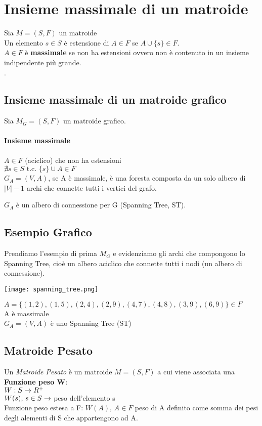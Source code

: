 \section{Insieme massimale di un matroide}
Sia $M=(S,F)$ un matroide\\
Un elemento $s \in S$ è estensione di $A \in F$ se $A \cup \{s\} \in F$.\\
$A \in F$ è \textbf{massimale} se non ha estensioni ovvero non è contenuto in un
insieme indipendente più grande.\\
.\\
\subsection{Insieme massimale di un matroide grafico}
Sia $M_G = (S,F)$ un matroide grafico.\\
\paragraph*{Insieme massimale}$A \in F$ (aciclico) che non ha estensioni\\
\ra $\nexists s \in S \text{ t.c. } \{s\} \cup A \in F$\\
$G_A = (V,A)$, se A è massimale, è una foresta composta da un solo albero di
$|V|-1$ archi che connette tutti i vertici del grafo.\\
\begin{box_giallochiaro}
    {$G_A$ è un albero di connessione per G (Spanning Tree, ST)}.
\end{box_giallochiaro}
\subsection*{Esempio Grafico}
Prendiamo l'esempio di prima $M_G$ e evidenziamo gli archi che compongono 
lo Spanning Tree, cioè un albero aciclico che connette tutti i nodi (un albero
di connessione).
\begin{center}
    \texttt{[image: spanning\_tree.png]}
\end{center}
$A = \{(1,2), (1,5), (2,4), (2,9), (4,7), (4,8), (3,9), (6,9)\} \in F$\\
\ra A è massimale\\
\ra $G_A = (V,A)$ è uno Spanning Tree (ST)
\subsection{Matroide Pesato}
Un \textit{Matroide Pesato} è un matroide $M=(S,F)$ a cui viene associata una
\textbf{Funzione peso W}:\\
$W:S \rightarrow R^+$\\
$W(s),\,s \in S \rightarrow$ peso dell'elemento s\\
Funzione peso estesa a F: $W(A),\, A \in F$ \ra peso di A definito come somma
dei pesi degli alementi di S che appartengono ad A.\\
